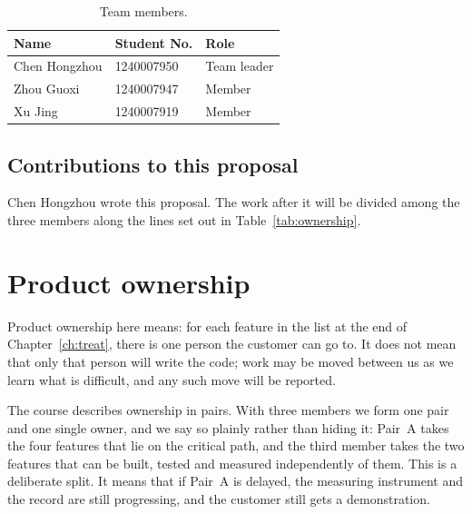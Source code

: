\documentclass[12pt,a4paper]{report}
\begin{document}
\begin{table}[H]
  \centering
  \caption{Team members.}
  \label{tab:team}
  \begin{tabular}{@{}p{4.2cm}p{3.4cm}l@{}}
    \toprule[1.5pt]
    \textbf{Name} & \textbf{Student No.} & \textbf{Role} \\
    \midrule
    Chen Hongzhou & 1240007950 & Team leader \\
    Zhou Guoxi & 1240007947 & Member \\
    Xu Jing & 1240007919 & Member \\
    \bottomrule[1.5pt]
  \end{tabular}
\end{table}

\subsection{Contributions to this proposal}

Chen Hongzhou wrote this proposal. The work after it will be divided among the
three members along the lines set out in Table~\ref{tab:ownership}.

\section{Product ownership}

Product ownership here means: for each feature in the list at the end of
Chapter~\ref{ch:treat}, there is one person the customer can go to. It does not
mean that only that person will write the code; work may be moved between us as
we learn what is difficult, and any such move will be reported.

The course describes ownership in pairs. With three members we form one pair and
one single owner, and we say so plainly rather than hiding it: Pair~A takes the
four features that lie on the critical path, and the third member takes the two
features that can be built, tested and measured independently of them. This is a
deliberate split. It means that if Pair~A is delayed, the measuring instrument
and the record are still progressing, and the customer still gets a
demonstration.
\end{document}

